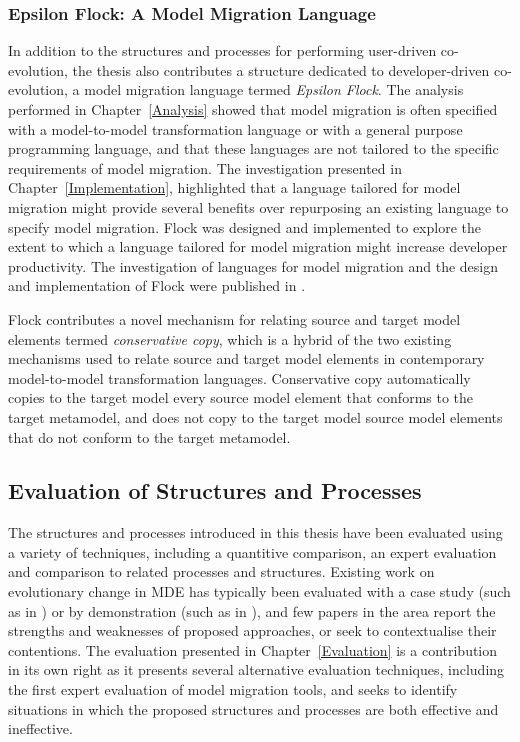 \subsubsection{Epsilon Flock: A Model Migration Language}
In addition to the structures and processes for performing user-driven co-evolution, the thesis also contributes a structure dedicated to developer-driven co-evolution, a model migration language termed \emph{Epsilon Flock}. The analysis performed in Chapter~\ref{Analysis} showed that model migration is often specified with a model-to-model transformation language or with a general purpose programming language, and that these languages are not tailored to the specific requirements of model migration. The investigation presented in Chapter~\ref{Implementation}, highlighted that a language tailored for model migration might provide several benefits over repurposing an existing language to specify model migration. Flock was designed and implemented to explore the extent to which a language tailored for model migration might increase developer productivity. The investigation of languages for model migration and the design and implementation of Flock were published in \cite{rose10flock}.

Flock contributes a novel mechanism for relating source and target model elements termed \emph{conservative copy}, which is a hybrid of the two existing mechanisms used to relate source and target model elements in contemporary model-to-model transformation languages. Conservative copy automatically copies to the target model every source model element that conforms to the target metamodel, and does not copy to the target model source model elements that do not conform to the target metamodel.


\subsection{Evaluation of Structures and Processes}
The structures and processes introduced in this thesis have been evaluated using a variety of techniques, including a quantitive comparison, an expert evaluation and comparison to related processes and structures. Existing work on evolutionary change in MDE has typically been evaluated with a case study (such as in \cite{sprinkle03thesis}) or by demonstration (such as in \cite{cicchetti08thesis}), and few papers in the area report the strengths and weaknesses of proposed approaches, or seek to contextualise their contentions. The evaluation presented in Chapter~\ref{Evaluation} is a contribution in its own right as it presents several alternative evaluation techniques, including the first expert evaluation of model migration tools, and seeks to identify situations in which the proposed structures and processes are both effective and ineffective.

